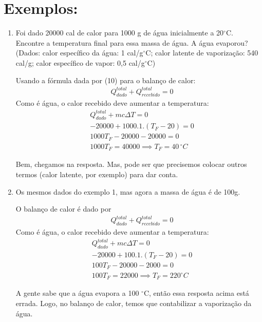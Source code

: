 \documentclass[12pt]{extarticle}
\newcommand{\<}{\langle}
\renewcommand{\>}{\rangle}
\theoremstyle{definition}
\newcommand{\grad}{$^\circ$}
\begin{document}
\section{Exemplos:}

\begin{enumerate}
    \item Foi dado 20000 cal de calor para 1000 g de água inicialmente a 20\grad C. Encontre a temperatura final para essa massa de água. A água evaporou?
    (Dados: calor específico da água: 1 cal/g\grad C; calor latente de vaporização: 540 cal/g; calor específico de vapor: 0,5 cal/g\grad C)
    
    Usando a fórmula dada por (10) para o balanço de calor:
    \begin{align*}
        &Q_{dado}^{total} + Q_{recebido}^{total} =0
        \end{align*}
        Como é água, o calor recebido deve aumentar a temperatura:
        \begin{align*}
        &Q_{dado}^{total} + mc\Delta T =0\\
        &-20000 + 1000. 1.(T_F - 20) =0 \\
        &1000T_F - 20000 - 20000 =0\\
        &1000T_F = 40000 \implies T_F = 40\,^\circ C
        \end{align*}
        
        Bem, chegamos na resposta. Mas, pode ser que precisemos colocar outros termos (calor latente, por exemplo) para dar conta.
        
        \item Os mesmos dados do exemplo 1, mas agora a massa de água é de 100g.
        
        O balanço de calor é dado por
        \begin{align*}
        &Q_{dado}^{total}+ Q_{recebido}^{total} =0
        \end{align*}
        Como é água, o calor recebido deve aumentar a temperatura:
        \begin{align*}
        &Q_{dado}^{total} + mc\Delta T =0\\
        &-20000 + 100. 1.(T_F - 20) =0 \\
        &100T_F - 20000 - 2000 =0 \\
        &100T_F = 22000 \implies T_F = 220 ^\circ C
        \end{align*}
        
        A gente sabe que a água evapora a 100 \grad C, então essa resposta acima está errada. Logo, no balanço de calor, temos que contabilizar a vaporização da água.
        

\end{enumerate}
\end{document}
